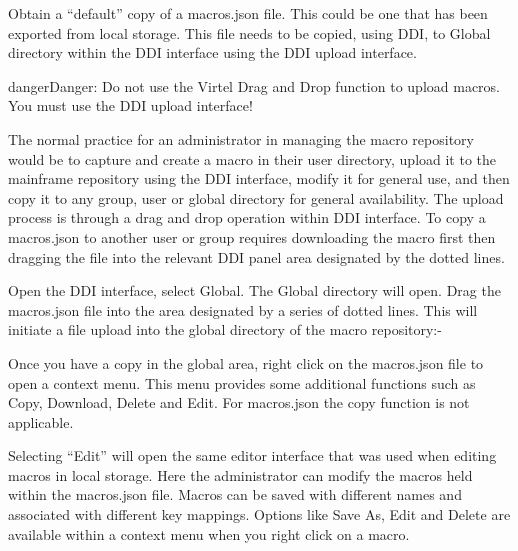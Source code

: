 \documentclass[letterpaper,10pt,english]{sphinxmanual}
\begin{document}
Obtain a “default” copy of a macros.json file. This could be one that has been exported from local storage. This file needs to be copied, using DDI, to Global directory within the DDI interface using the DDI
upload interface.

\begin{sphinxadmonition}{danger}{Danger:}
Do not use the Virtel Drag and Drop function to upload macros. You must use the DDI upload interface!
\end{sphinxadmonition}

The normal practice for an administrator in managing the macro repository would be to capture and create a macro in their user directory, upload it to the mainframe repository using the DDI interface, modify it for general use, and then copy it to any group, user or global directory for general availability. The upload process is through a drag and drop operation within DDI interface. To copy a
macros.json to another user or group requires downloading the macro first then dragging the file into the relevant DDI panel area designated by the dotted lines.


Open the DDI interface, select Global. The Global directory will open. Drag the macros.json file into the area designated by a series of dotted lines. This will initiate a file upload into the global directory of the macro repository:-



Once you have a copy in the global area, right click on the macros.json file to open a context menu. This menu provides some additional functions such as Copy, Download, Delete and Edit. For macros.json the
copy function is not applicable.



Selecting “Edit” will open the same editor interface that was used when editing macros in local storage. Here the administrator can modify the macros held within the macros.json file. Macros can be saved with
different names and associated with different key mappings. Options like Save As, Edit and Delete are available within a context menu when you right click on a macro.

\end{document}
